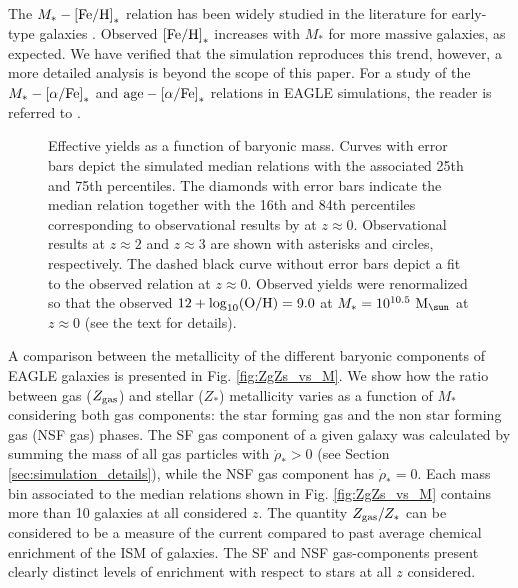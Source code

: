 \documentclass[useAMS,usenatbib]{mn2e}
\begin{document}
The $M_* - {\rm [Fe/H]}_*$ relation 
has been widely studied in the literature for early-type galaxies \citep[e.g.][]{conroy2014}.
Observed ${\rm [Fe/H]}_*$ increases with $M_*$ for more massive galaxies, as expected.  
We have verified that the simulation reproduces this trend, 
however, a more detailed analysis is beyond the scope of this paper.
For a study of the $M_* - {\rm [ \alpha / Fe]}_*$ and ${\rm age} - {\rm [ \alpha / Fe]}_*$
relations in {\sc EAGLE} simulations, the reader is referred to \citet{segers2016a}.

\begin{figure}
\begin{center}
\end{center}
\caption[]
{
Effective yields as a function of baryonic mass.
Curves with error bars depict the simulated median
relations with the associated 25th and 75th percentiles.
The diamonds with error bars indicate the median relation together with the 16th and 84th percentiles
corresponding to observational results by \citet[][]{tremonti2004} at $z\approx0$.  
Observational results at $z\approx2$ \citep{erb2006} and $z\approx3$ \citep{troncoso2014} 
are shown with asterisks and circles, respectively. 
The dashed black curve without error bars depict a fit to the observed relation 
at $z\approx0$.  
Observed yields were renormalized so that the observed $12 + {\log}_{10}({\rm O/H}) = 9.0$ at $M_* = 10^{10.5} \ {\rm M}_{\sun}$ 
at $z\approx0$ (see the text for details).
}
\label{fig:yeff_vs_M}
\end{figure}

A comparison between the metallicity of the different baryonic components of {\sc EAGLE}
galaxies is presented in Fig. \ref{fig:ZgZs_vs_M}.  We show how the ratio between 
gas ($Z_{\rm gas}$) and stellar ($Z_*$) metallicity varies as a function of $M_*$ considering both gas components:
the star forming gas and the non star forming gas (NSF gas) phases.  
The SF gas component of a given galaxy was calculated by summing the mass of all gas particles
with ${\dot {\rho}}_* > 0$ (see Section \ref{sec:simulation_details}), while the NSF gas component
has ${\dot {\rho}}_* = 0$.
Each mass bin associated to the median relations shown in Fig. \ref{fig:ZgZs_vs_M} 
contains more than 10 galaxies at all considered $z$.
The quantity $Z_{\rm gas}/Z_*$ can be considered to be a measure of the current compared
to past average chemical enrichment of the ISM of galaxies.
The SF and NSF gas-components
present clearly distinct levels of enrichment with respect to stars at all $z$ considered.
\end{document}
